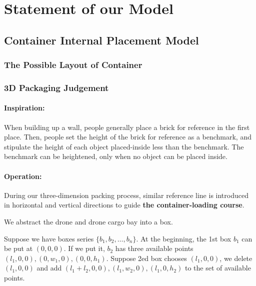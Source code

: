 \documentclass{mcmthesis}
\begin{document}
\section{Statement of our Model}\label{Sec:stat}

\subsection{Container Internal Placement Model}



\subsubsection{The Possible Layout of Container}



\subsubsection{3D Packaging Judgement}


\paragraph{Inspiration:}When building up a wall, people generally place a brick for reference in the first place. Then, people set the height of the brick for reference as a benchmark, and stipulate the height of each object placed-inside less than the benchmark. The benchmark can be heightened, only when no object can be placed inside.

\paragraph{Operation:}During our three-dimension packing process, similar reference line is introduced in horizontal and vertical directions to guide \textbf{the container-loading course}. 




We abstract the drone and drone cargo bay into a box.

Suppose we have boxes series $\{b_1,b_2,\dots,b_n\}$. At the beginning, the 1st box $b_1$ can be put at $(0,0,0)$. If we put it, $b_2$ has three available points $(l_1,0,0),(0,w_1,0),(0,0,h_1)$. Suppose 2ed box chooses $(l_1,0,0)$, we delete $(l_1,0,0)$ and add $(l_1+l_2,0,0),(l_1,w_2,0),(l_1,0,h_2)$ to the set of available points.
\end{document}
